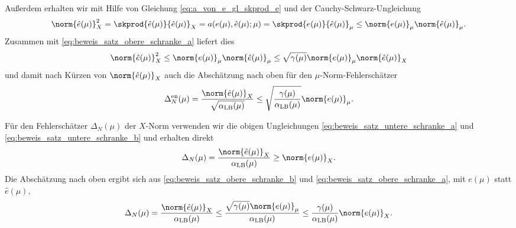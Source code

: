 \begin{Satz}
\begin{Beweis}
        Außerdem erhalten wir mit Hilfe von Gleichung \eqref{eq:a_von_e_gl_skprod_e} und der Cauchy-Schwarz-Ungleichung
        \begin{equation}
            \label{eq:beweis_satz_obere_schranke_notag}
            \norm{\hat e(\mu)}^2_X = \skprod{\hat e(\mu)}{\hat e(\mu)}_X = a(e(\mu), \hat e(\mu); \mu)
            = \skprod{e(\mu)}{\hat e(\mu)}_{\mu} \leq \norm{e(\mu)}_{\mu} \norm{\hat e(\mu)}_{\mu}.
        \end{equation}
        Zusammen mit \eqref{eq:beweis_satz_obere_schranke_a} liefert dies
        \begin{equation}
            \label{eq:beweis_satz_obere_schranke_b}
            \norm{\hat e(\mu)}^2_X \leq \norm{e(\mu)}_{\mu} \norm{\hat e(\mu)}_{\mu} \leq \sqrt{\gamma(\mu)} \norm{e(\mu)}_{\mu} \norm{\hat e(\mu)}_X
        \end{equation}
        und damit nach Kürzen von $\norm{\hat e(\mu)}_X$ auch die Abschätzung nach oben für den $\mu$-Norm-Fehlerschätzer
        \begin{equation}
            \Delta_N^{\text{en}}(\mu) = \frac{\norm{\hat e(\mu)}_X}{\sqrt{\alpha_{\text{LB}}(\mu)}} \leq \sqrt{\frac{\gamma(\mu)}{\alpha_{\text{LB}}(\mu)}} \norm{e(\mu)}_{\mu}.
        \end{equation}

        Für den Fehlerschätzer $\Delta_N(\mu)$ der $X$-Norm verwenden wir die obigen Ungleichungen \eqref{eq:beweis_satz_untere_schranke_a} und \eqref{eq:beweis_satz_untere_schranke_b} und erhalten direkt
        \begin{equation}
            \Delta_N(\mu) = \frac{\norm{\hat e(\mu)}_X}{\alpha_\text{LB}(\mu)} \geq \norm{e(\mu)}_X.
        \end{equation}
        Die Abschätzung nach oben ergibt sich aus \eqref{eq:beweis_satz_obere_schranke_b} und \eqref{eq:beweis_satz_obere_schranke_a}, mit $e(\mu)$ statt $\hat e(\mu)$,
        \begin{equation}
            \Delta_N(\mu)
            = \frac{\norm{\hat e(\mu)}_X}{\alpha_\text{LB}(\mu)}
            \leq \frac{\sqrt{\gamma(\mu)}\norm{e(\mu)}_{\mu} }{\alpha_\text{LB}(\mu)}
            \leq \frac{\gamma(\mu)}{\alpha_\text{LB}(\mu)} \norm{e(\mu)}_X.
        \end{equation}


\end{Beweis}
\end{Satz}
